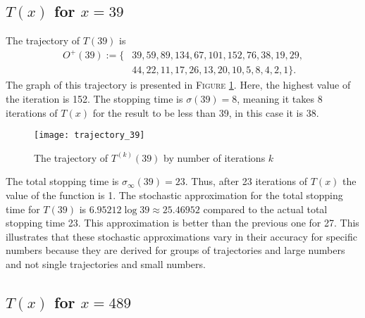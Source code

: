 \documentclass[12pt,a4paper,reqno]{amsart}
\begin{document}
\subsection{$T(x)$ for $x=39$}

The trajectory of $T(39)$ is 
\begin{align}
    \nonumber
    O^+(39):=\{&39,59,89,134,67,101,152,76,38,19,29,\\
    \nonumber
               &44,22,11,17,26,13,20,10,5,8,4,2,1\}.
\end{align}
The graph of this trajectory is presented in \textsc{Figure} \ref{fig:02}. 
Here, the highest value of the iteration is 152. The stopping time is 
$\sigma(39)=8$, meaning it takes 8 iterations of $T(x)$ for the result to be 
less than 39, in this case it is 38.
\begin{figure}[h]
\texttt{[image: trajectory\_39]}
    \caption{The trajectory of $T^{(k)}(39)$ by number of iterations $k$}
\label{fig:02}
\end{figure}
The total stopping time is $\sigma_{\infty}(39)=23$. Thus, after 23 iterations 
of $T(x)$ the value of the function is 1. The stochastic approximation for the 
total stopping time for $T(39)$ is $6.95212 \log 39 \approx 25.46952$ compared
to the actual total stopping time 23. This approximation is better than the 
previous one for 27. This illustrates that these stochastic approximations vary 
in their accuracy for specific numbers because they are derived for groups of 
trajectories and large numbers and not single trajectories and small numbers.

\subsection{$T(x)$ for $x=489$}
\end{document}
